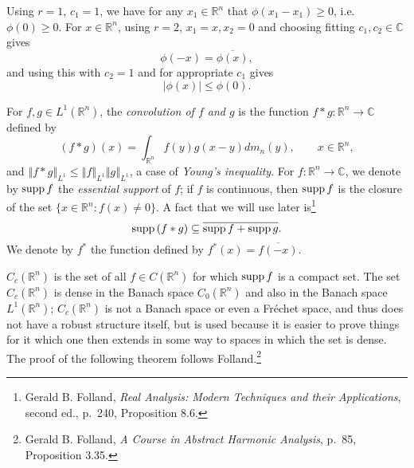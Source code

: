 \documentclass{article}
\newcommand{\supp}{\ensuremath\mathrm{supp}\,}
\newcommand{\norm}[1]{\left\Vert #1 \right\Vert}
\theoremstyle{definition}
\begin{document}
Using $r=1$, $c_1=1$, we have for any $x_1 \in \mathbb{R}^n$ that $\phi(x_1-x_1) \geq 0$, i.e. $\phi(0) \geq 0$. For $x \in \mathbb{R}^n$,
using $r=2$, $x_1=x, x_2=0$ and choosing fitting  $c_1,c_2 \in \mathbb{C}$ gives
\[
\phi(-x)=\overline{\phi(x)},
\]
and using this with $c_2=1$ and for appropriate $c_1$ gives
\[
|\phi(x)| \leq \phi(0).
\]

For $f,g \in L^1(\mathbb{R}^n)$, the {\em convolution of $f$ and $g$} is the function $f*g:\mathbb{R}^n \to \mathbb{C}$ defined by
\[
(f*g)(x) = \int_{\mathbb{R}^n} f(y)g(x-y) dm_n(y), \qquad x \in \mathbb{R}^n,
\]
and $\norm{f*g}_{L^1} \leq \norm{f}_{L^1} \norm{g}_{L^1}$, a case of {\em Young's inequality}.
For $f:\mathbb{R}^n \to \mathbb{C}$, we denote by $\supp f$ the {\em essential support} of $f$; if $f$ is continuous, then $\supp f$ is the closure of the set
$\{x \in \mathbb{R}^n: f(x) \neq 0\}$.
A fact that we will use later is\footnote{Gerald B. Folland, {\em Real
Analysis: Modern Techniques and their Applications}, second ed., p.~240, Proposition 8.6.}
\[
\supp(f*g) \subseteq \overline{\supp f + \supp g}.
\]
We denote by $f^*$ the function defined by $f^*(x)=\overline{f(-x)}$.

$C_c(\mathbb{R}^n)$ is the set of all $f \in C(\mathbb{R}^n)$ for which $\supp f$ is a compact set.
The set $C_c(\mathbb{R}^n)$ is dense in the Banach space
$C_0(\mathbb{R}^n)$  and also in the Banach space $L^1(\mathbb{R}^n)$; $C_c(\mathbb{R}^n)$ is not a Banach space or even a Fr\'echet space,
and thus does not have a robust structure itself, but is used because it is easier to prove things for it which one then extends in some way to spaces
in which the set is dense.
The proof of the following theorem
follows Folland.\footnote{Gerald B. Folland, {\em A Course in Abstract Harmonic Analysis}, p.~85, Proposition 3.35.}
\end{document}

